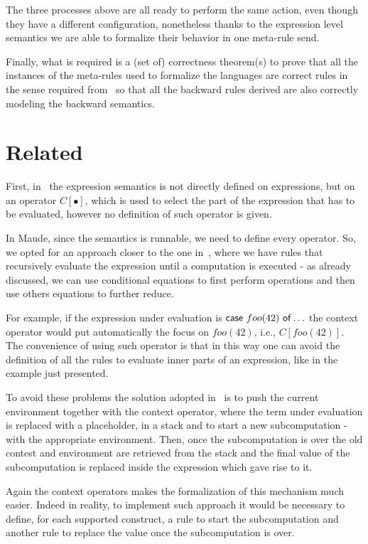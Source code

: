 \documentclass{article}[12pt,a4paper]
\theoremstyle{definition}
\begin{document}
The three processes above are all ready to perform the same action, even though
they have a different configuration, nonetheless thanks to the expression level
semantics we are able to formalize their behavior in one meta-rule send.

Finally, what is required is a (set of) correctness theorem(s) to prove that all
the instances of the meta-rules used to formalize the languages are correct
rules in the sense required from~\cite{LaneseM20} so that all the backward rules
derived are also correctly modeling the backward semantics.

\section{Related}\label{sec:related}
First, in~\cite{Gonzalez-AbrilV21} the expression semantics is not directly
defined on expressions, but on an
operator $C[\bullet]$, which is used to select the part of the expression that has to be
evaluated, however no definition of such operator is given.

In Maude, since the semantics is
runnable, we need to define every operator. So, we opted for an approach closer
to the one in~\cite{LaneseNPV18}, where we have rules that recursively evaluate
the expression until a computation is executed - as already discussed, we can use
conditional equations to first perform operations and then use others equations
to further reduce.


For example, if the expression under evaluation is
$\mathsf{case}~foo(42)~\mathsf{of}\ldots$ the context operator would put automatically
the focus on $foo(42)$, i.e., $C[foo(42)]$. The convenience of using such
operator is that in this way one can avoid the definition of all the rules to
evaluate inner parts of an expression, like in the example just presented.

To avoid these problems the solution adopted
in~\cite{Gonzalez-AbrilV21} is to push the current environment together with the
context operator, where the term under evaluation is replaced with a
placeholder, in a stack and to start a new subcomputation - with the appropriate
environment. Then, once the
subcomputation is over the old contest and environment are retrieved from the
stack and the final value of the subcomputation is replaced inside the expression
which gave rise to it.

Again the context operators makes the formalization of this mechanism
much easier. Indeed in reality, to implement such approach it would be necessary to define, for each supported construct, a rule to start the subcomputation and another rule to replace the
value once the subcomputation is over.
\end{document}
